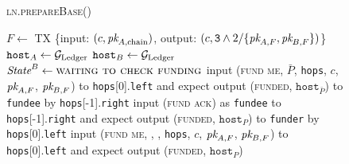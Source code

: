 \begin{figure}[H]
  \begin{processbox}{\textsc{ln.prepareBase}()}
    \begin{algorithmic}[1]
       
        \State $F \gets$ TX \{input: $(c, \textit{pk}_{A, \mathrm{chain}})$, output: $(c,
        \texttt{3} \wedge 2/\{\textit{pk}_{A, F}, \textit{pk}_{B, F}\})$\}
        \label{code:ln:base:create-funding}
        \State $\texttt{host}_A \gets \mathcal{G}_{\mathrm{Ledger}}$
          \State $\texttt{host}_B \gets \mathcal{G}_{\mathrm{Ledger}}$
          \State $\textit{State}^B \gets \textsc{waiting to check funding}$
        \EndIf
      \Else \: 
          \State input (\textsc{fund me}, $\bar{P}$, \texttt{hops}, $c$, $\textit{pk}_{A,
          F}$, $\textit{pk}_{B, F}$) to \texttt{hops}[0].\texttt{left} and expect output
          (\textsc{funded}, $\texttt{host}_{\bar{P}}$) to \texttt{fundee} by
          \texttt{hops}[-1].\texttt{right} 
          \State input (\textsc{fund ack}) as \texttt{fundee} to
          \texttt{hops}[-1].\texttt{right} and expect output (\textsc{funded},
          $\texttt{host}_P$) to \texttt{funder} by
          \texttt{hops}[0].\texttt{left}
        \Else \: 
          \State input (\textsc{fund me}, \alice, \bob, \texttt{hops}, $c$,
          $\textit{pk}_{A, F}$, $\textit{pk}_{B, F}$) to \texttt{hops}[0].\texttt{left} and expect
          output (\textsc{funded}, $\texttt{host}_P$) 
        \EndIf
      \EndIf
    \end{algorithmic}
  \end{processbox}
  \caption{}
  \label{code:ln:prepare-base}
\end{figure}

